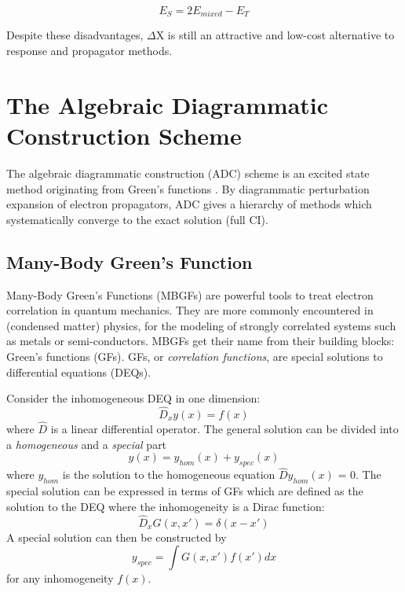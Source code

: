 \begin{equation}
E_S = 2 E_{mixed} - E_T
\end{equation}

Despite these disadvantages, $\Delta$X is still an attractive and low-cost alternative to response and propagator methods.


\section{The Algebraic Diagrammatic Construction Scheme}

The algebraic diagrammatic construction (ADC) scheme is an excited state method originating from Green's functions \cite{Sch1982,Sch2018}. By diagrammatic perturbation expansion of electron propagators, ADC gives a hierarchy of methods which systematically converge to the exact solution (full CI).  

\subsection{Many-Body Green's Function}

Many-Body Green's Functions (MBGFs) are powerful tools to treat electron correlation in quantum mechanics. They are more commonly encountered in (condensed matter) physics, for the modeling of strongly correlated systems such as metals or semi-conductors. MBGFs get their name from their building blocks: Green's functions (GFs). GFs, or \emph{correlation functions}, are special solutions to differential equations (DEQs).

Consider the inhomogeneous DEQ in one dimension:
\begin{equation}
\hat{D}_x y(x) = f(x)
\end{equation}
\noindent where $\hat{D}$ is a linear differential operator. The general solution can be divided into a \emph{homogeneous} and a \emph{special} part
\begin{equation}
y(x) = y_{hom}(x) + y_{spec}(x)
\end{equation}
\noindent where $y_{hom}$ is the solution to the homogeneous equation $\hat{D}y_{hom}(x)$ = 0. The special solution can be expressed in terms of GFs which are defined as the solution to the DEQ where the inhomogeneity is a Dirac function:
\begin{equation}
\hat{D}_x G(x,x') = \delta(x-x')
\end{equation}
\noindent A special solution can then be constructed by
\begin{equation}
y_{spec} = \int G(x,x')f(x') dx
\end{equation}
\noindent for any inhomogeneity $f(x)$. 

